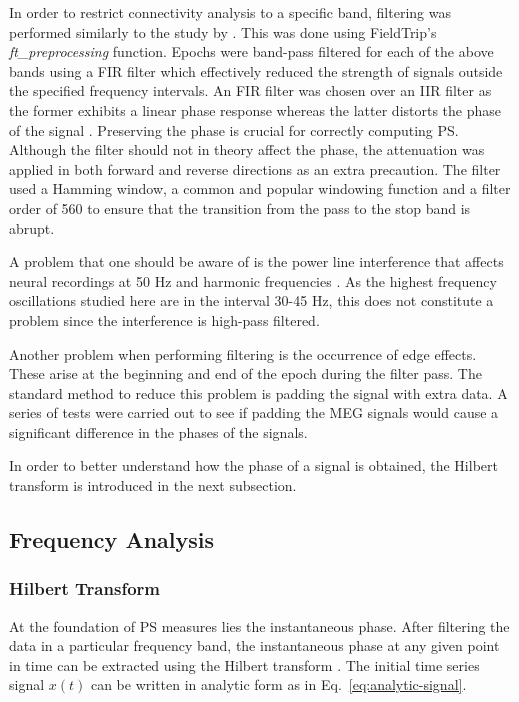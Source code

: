 			In order to restrict connectivity analysis to a specific band, filtering was performed similarly to the study by \textcite{Stam2009}. This was done using FieldTrip's \textit{ft_preprocessing} function. Epochs were band-pass filtered for each of the above bands using a \ac{FIR} filter which effectively reduced the strength of signals outside the specified frequency intervals. An \ac{FIR} filter was chosen over an \ac{IIR} filter as the former exhibits a linear phase response whereas the latter distorts the phase of the signal \autocite{Gross2013}. Preserving the phase is crucial for correctly computing \ac{PS}. Although the filter should not in theory affect the phase, the attenuation was applied in both forward and reverse directions as an extra precaution. The filter used a Hamming window, a common and popular windowing function and a filter order of 560 to ensure that the transition from the pass to the stop band is abrupt.   

			A problem that one should be aware of is the power line interference that affects neural recordings at 50 Hz and harmonic frequencies \autocite{Keshtkaran2014}. As the highest frequency oscillations studied here are in the interval 30-45 Hz, this does not constitute a problem since the interference is high-pass filtered.

			Another problem when performing filtering is the occurrence of edge effects. These arise at the beginning and end of the epoch during the filter pass. The standard method to reduce this problem is padding the signal with extra data. A series of tests were carried out to see if padding the \ac{MEG} signals would cause a significant difference in the phases of the signals. 

			In order to better understand how the phase of a signal is obtained, the Hilbert transform is introduced in the next subsection.

		\subsection{Frequency Analysis}

			\subsubsection{Hilbert Transform}
			At the foundation of \ac{PS} measures lies the instantaneous phase. After filtering the data in a particular frequency band, the instantaneous phase at any given point in time can be extracted using the Hilbert transform \autocite{LeVanQuyen2001}. The initial time series signal \(x(t)\) can be written in analytic form as in Eq.~\ref{eq:analytic-signal}.

